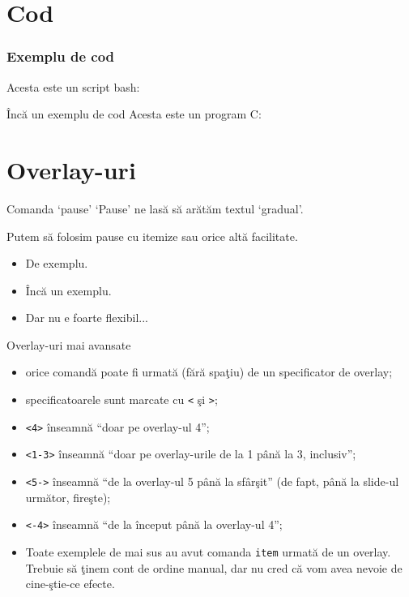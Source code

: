 \documentclass{beamer}
\begin{document}
\section{Cod}
\frame{\tableofcontents[currentsection]}

\begin{frame}
  \frametitle{Exemplu de cod}
  Acesta este un script bash:\\
\end{frame}

\begin{frame}{Încă un exemplu de cod}
  Acesta este un program C:

  
\end{frame}

\section{Overlay-uri}
\frame{\tableofcontents[currentsection]}

\begin{frame}{Comanda `pause'}
  `Pause' ne lasă să arătăm textul `gradual'.

  \pause Putem să folosim pause cu itemize sau orice altă facilitate.
  \begin{itemize}
    \pause \item De exemplu.
    \pause \item Încă un exemplu.
    \pause \item Dar nu e foarte flexibil...
  \end{itemize}
\end{frame}

\begin{frame}{Overlay-uri mai avansate}
  \begin{itemize}
  \item<3-> orice comandă poate fi urmată (fără spaţiu) de un specificator de
    overlay;
  \item<4-> specificatoarele sunt marcate cu \texttt{<} şi \texttt{>};
  \item<5-> \texttt{<4>} înseamnă ``doar pe overlay-ul 4'';
  \item<5-> \texttt{<1-3>} înseamnă ``doar pe overlay-urile de la 1 până la 3,
    inclusiv'';
  \item<6-> \texttt{<5->} înseamnă ``de la overlay-ul 5 până la sfârşit'' (de
    fapt, până la slide-ul următor, fireşte);
  \item<6-> \texttt{<-4>} înseamnă ``de la început până la overlay-ul 4'';
  \item<7-> Toate exemplele de mai sus au avut comanda \texttt{item} urmată de
    un overlay. Trebuie să ţinem cont de ordine manual, dar nu cred că vom avea
    nevoie de cine-ştie-ce efecte.
  \end{itemize}
\end{frame}
\end{document}
